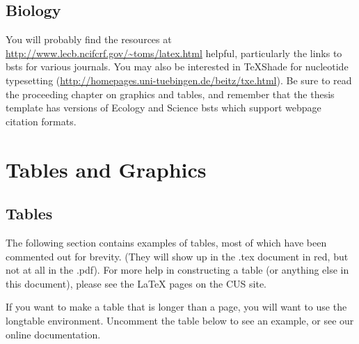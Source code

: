 \documentclass[12pt,twoside]{reedthesis}
\begin{document}
\section{Biology}
You will probably find the resources at \url{http://www.lecb.ncifcrf.gov/~toms/latex.html} helpful, particularly the links to bsts for various journals. You may also be interested in TeXShade for nucleotide typesetting (\url{http://homepages.uni-tuebingen.de/beitz/txe.html}).  Be sure to read the proceeding chapter on graphics and tables, and remember that the thesis template has versions of Ecology and Science bsts which support webpage citation formats. 

\chapter{Tables and Graphics}

\section{Tables}
	The following section contains examples of tables, most of which have been commented out for brevity. (They will show up in the .tex document in red, but not at all in the .pdf). For more help in constructing a table (or anything else in this document), please see the LaTeX pages on the CUS site. 


	\clearpage 

If you want to make a table that is longer than a page, you will want to use the longtable environment. Uncomment the table below to see an example, or see our online documentation.

\end{document}
